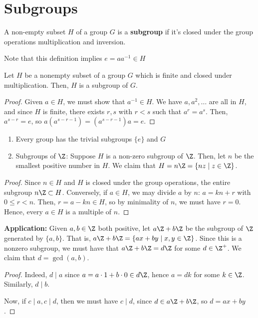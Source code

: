 \section{Subgroups}

\begin{defn}
    A non-empty subset $H$ of a group $G$ is a \textbf{subgroup} if it's closed under the group operations multiplication and inversion.
\end{defn}

Note that this definition implies $e=aa^{-1} \in H$

\begin{lem}
    Let $H$ be a nonempty subset of a group $G$ which is finite and closed under multiplication. Then, $H$ is a subgroup of $G$.
\end{lem}

\begin{proof}
    Given $a \in H$, we must show that $a^{-1} \in H$. We have $a,a^2,\dots$ are all in $H$, and since $H$ is finite, there exists $r,s$ with $r<s$ such that $a^r=a^s$. Then, $a^{s-r}=e$, so $a(a^{s-r-1})=(a^{s-r-1})a=e$.
\end{proof}

\begin{ex}
    \begin{enumerate}
        \item Every group has the trivial subgroups $\{e\}$ and $G$
        \item Subgroups of $\Z$: Suppose $H$ is a non-zero subgroup of $\Z$. Then, let $n$ be the smallest positive number in $H$. We claim that $H = n\Z=\{ nz \mid z \in \Z\}$.
    \end{enumerate}
    \begin{proof}
        Since $n \in H$ and $H$ is closed under the group operations, the entire subgroup $n\Z \subset H$. Conversely, if $a \in H$, we may divide $a$ by $n$: $a=kn+r$ with $0 \leq r <n$. Then, $r = a-kn\in H$, so by minimality of $n$, we must have $r = 0$. Hence, every $a \in H$ is a multiple of $n$.
    \end{proof}
\end{ex}

\textbf{Application:} Given $a,b \in \Z$ both positive, let $a\Z + b\Z$ be the subgroup of $\Z$ generated by $\{a,b\}$. That is, $a\Z + b\Z = \{ax+by \mid x,y \in \Z\}$. Since this is a nonzero subgroup, we must have that $a\Z + b\Z = d\Z$ for some $d \in \Z^+$. We claim that $d=\gcd(a,b)$.

\begin{proof}
    Indeed, $d \mid a$ since $a=a\cdot 1 + b\cdot 0 \in d\Z$, hence $a = dk$ for some $k \in \Z$. Similarly, $d \mid b$.

    Now, if $c \mid a, c \mid d$, then we must have $c \mid d$, since $d \in a\Z + b\Z$, so $d=ax+by$.
\end{proof}

